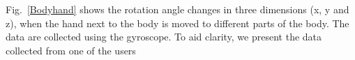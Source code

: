 Fig.~\ref{Bodyhand} shows the rotation angle changes in three dimensions (x, y and z), when the hand next to the body is moved to different
parts of the body. The data are collected using the gyroscope. To aid clarity, we present the data collected from one of the users
